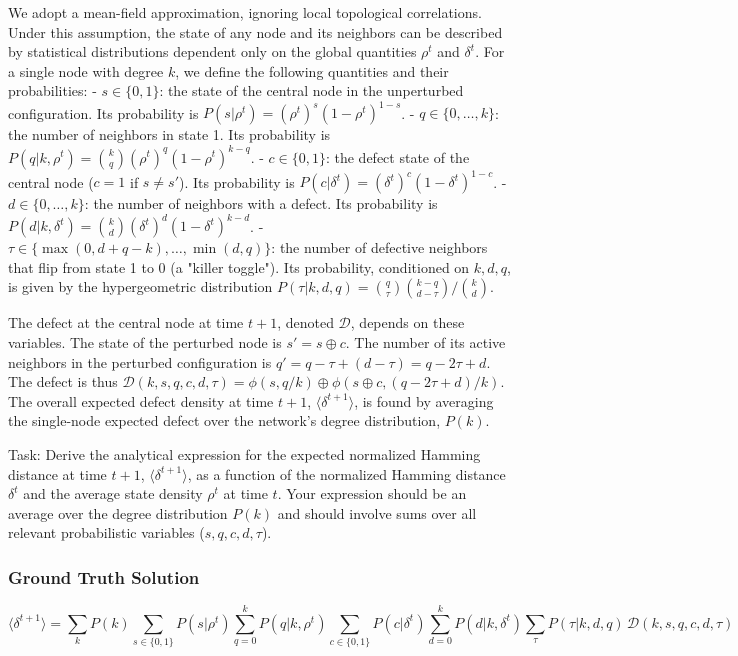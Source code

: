 \documentclass[10pt]{article}
\begin{document}
We adopt a mean-field approximation, ignoring local topological correlations. Under this assumption, the state of any node and its neighbors can be described by statistical distributions dependent only on the global quantities $\rho^t$ and $\delta^t$. For a single node with degree $k$, we define the following quantities and their probabilities:
- $s \in \{0,1\}$: the state of the central node in the unperturbed configuration. Its probability is $P(s|\rho^t) = (\rho^t)^s (1-\rho^t)^{1-s}$.
- $q \in \{0, \dots, k\}$: the number of neighbors in state 1. Its probability is $P(q|k,\rho^t) = \binom{k}{q} (\rho^t)^q (1-\rho^t)^{k-q}$.
- $c \in \{0,1\}$: the defect state of the central node ($c=1$ if $s \neq s'$). Its probability is $P(c|\delta^t) = (\delta^t)^c (1-\delta^t)^{1-c}$.
- $d \in \{0, \dots, k\}$: the number of neighbors with a defect. Its probability is $P(d|k,\delta^t) = \binom{k}{d}(\delta^t)^d (1-\delta^t)^{k-d}$.
- $\tau \in \{\max(0, d+q-k), \dots, \min(d,q)\}$: the number of defective neighbors that flip from state 1 to 0 (a "killer toggle"). Its probability, conditioned on $k, d, q$, is given by the hypergeometric distribution $P(\tau|k, d, q) = \binom{q}{\tau}\binom{k-q}{d-\tau} / \binom{k}{d}$.

The defect at the central node at time $t+1$, denoted $\mathcal{D}$, depends on these variables. The state of the perturbed node is $s' = s \oplus c$. The number of its active neighbors in the perturbed configuration is $q' = q - \tau + (d-\tau) = q - 2\tau + d$. The defect is thus $\mathcal{D}(k, s, q, c, d, \tau) = \phi(s, q/k) \oplus \phi(s\oplus c, (q-2\tau+d)/k)$. The overall expected defect density at time $t+1$, $\langle\delta^{t+1}\rangle$, is found by averaging the single-node expected defect over the network's degree distribution, $P(k)$.

Task:
Derive the analytical expression for the expected normalized Hamming distance at time $t+1$, $\langle\delta^{t+1}\rangle$, as a function of the normalized Hamming distance $\delta^t$ and the average state density $\rho^t$ at time $t$. Your expression should be an average over the degree distribution $P(k)$ and should involve sums over all relevant probabilistic variables ($s, q, c, d, \tau$).

\subsubsection*{Ground Truth Solution}
\[ \boxed{\langle\delta^{t+1}\rangle = \sum_k P(k) \sum_{s \in \{0,1\}} P(s|\rho^t) \sum_{q=0}^k P(q|k,\rho^t) \sum_{c \in \{0,1\}}P(c|\delta^t) \sum_{d=0}^k P(d|k, \delta^t) \sum_{\tau} P(\tau|k,d,q) \, \mathcal{D}(k, s, q, c, d, \tau)} \]
\end{document}
